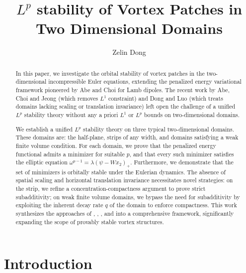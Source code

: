 \documentclass[11pt,letterpaper]{amsart}
\theoremstyle{definition}
\theoremstyle{remark}
\numberwithin{equation}{section}
\begin{document}
\title{$L^p$ stability of Vortex Patches in Two Dimensional Domains}

 \author{Zelin Dong}
 \address{Department of Mathematics, The Chinese University of Hong Kong, 
 Shatin, NT, Hong Kong SAR}

\flushbottom

\begin{abstract}
In this paper, we investigate the orbital stability of vortex patches in the two-dimensional incompressible Euler equations, extending the penalized energy variational framework pioneered by Abe and Choi \cite{abe2022stability} for Lamb dipoles. The recent work by Abe, Choi and Jeong \cite{Abe2025StabilityOL} (which removes $L^1$ constraint) and Dong and Luo \cite{Dong2026StabilityOV} (which treats domains lacking scaling or translation invariance) left open the challenge of a unified $L^p$ stability theory without any a priori $L^1$ or $L^p$ bounds on two-dimensional domains.

We establish a unified $L^p$ stability theory on three typical two-dimensional domains. These domains are: the half-plane, strips of any width, and domains satisfying a weak finite volume condition. For each domain, we prove that the penalized energy functional admits a minimizer for suitable $p$, and that every such minimizer satisfies the elliptic equation $\omega^{p-1} = \lambda(\psi - W x_2)_+$. Furthermore, we demonstrate that the set of minimizers is orbitally stable under the Eulerian dynamics. The absence of spatial scaling and horizontal translation invariance necessitates novel strategies: on the strip, we refine a concentration-compactness argument to prove strict subadditivity; on weak finite volume domains, we bypass the need for subadditivity by exploiting the inherent decay rate $q$ of the domain to enforce compactness. 
This work synthesizes the approaches of \cite{abe2022stability}, \cite{Abe2025StabilityOL}, \cite{abe2025existence}, and \cite{Dong2026StabilityOV} into a comprehensive framework, significantly expanding the scope of provably stable vortex structures.
\end{abstract}

\maketitle

\tableofcontents

\thispagestyle{empty}

\section{Introduction}
\end{document}
